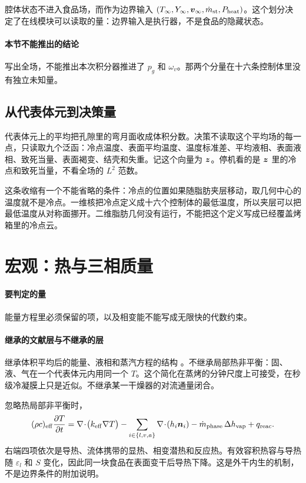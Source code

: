 腔体状态不进入食品场，而作为边界输入 \((T_\infty,Y_\infty,\bm{v}_\infty,\dot m_{\mathrm{st}},P_{\mathrm{heat}})\)。这个划分决定了在线模块可以读取的量：边界输入是执行器，不是食品的隐藏状态。

\paragraph{本节不能推出的结论}
写出全场，不能推出本次积分器推进了 \(p_g\) 和 \(\omega_v\)。那两个分量在十六条控制体里没有独立未知量。

\subsection{从代表体元到决策量}

代表体元上的平均把孔隙里的弯月面收成体积分数。决策不读取这个平均场的每一点，只读取九个泛函：冷点温度、表面平均温度、温度标准差、平均液相、表面液相、致死当量、表面褐变、结壳和失重。记这个向量为 \(\bm{z}\)。停机看的是 \(\bm{z}\) 里的冷点和致死当量，不看全场的 \(L^2\) 范数。

这条收缩有一个不能省略的条件：冷点的位置如果随脂肪夹层移动，取几何中心的温度就不是冷点。一维核把冷点定义成十六个控制体的最低温度，所以夹层可以把最低温度从对称面挪开。二维脂肪几何没有运行，不能把这个定义写成已经覆盖烤箱里的冷点云。

\section{宏观：热与三相质量}

\paragraph{要判定的量}
能量方程里必须保留的项，以及相变能不能写成无限快的代数约束。

\paragraph{继承的文献层与不继承的层}
继承体积平均后的能量、液相和蒸汽方程的结构 \cite{whitaker1977,datta2007}。不继承局部热非平衡：固、液、气在一个代表体元内用同一个 \(T\)。这个简化在蒸烤的分钟尺度上可接受，在秒级冷凝膜上只是近似。不继承某一干燥器的对流通量闭合。

忽略热局部非平衡时，
\begin{equation}
\label{eq:energy}
(\rho c)_{\mathrm{eff}}\frac{\partial T}{\partial t}
=\nabla\!\cdot\!\big(k_{\mathrm{eff}}\nabla T\big)
-\sum_{i\in\{l,v,a\}}\nabla\!\cdot\!(h_i\bm{n}_i)
-\dot m_{\mathrm{phase}}\,\Delta h_{\mathrm{vap}}
+q_{\mathrm{reac}}.
\end{equation}
右端四项依次是导热、流体携带的显热、相变潜热和反应热。有效容积热容与导热随 \(\varepsilon_l\) 和 \(S\) 变化，因此同一块食品在表面变干后导热下降。这是外干内生的机制，不是边界条件的附加说明。

